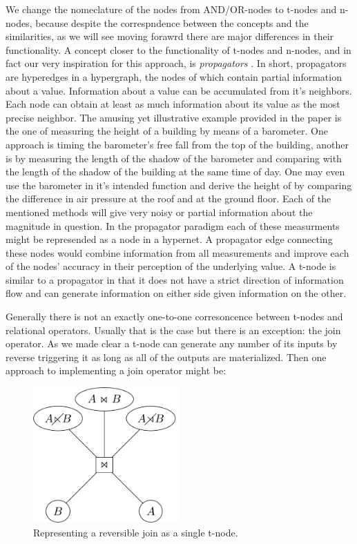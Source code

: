 We change the nomeclature of the nodes from AND/OR-nodes to t-nodes
and n-nodes, because despite the correspndence between the concepts
and the similarities, as we will see moving forawrd there are major
differences in their functionality. A concept closer to the
functionality of t-nodes and n-nodes, and in fact our very inspiration
for this approach, is \emph{propagators}
\cite{radulPropagationNetworksFlexible2009a}. In short, propagators are
hyperedges in a hypergraph, the nodes of which contain partial
information about a value. Information about a value can be
accumulated from it's neighbors. Each node can obtain at least as much
information about its value as the most precise neighbor. The amusing
yet illustrative example provided in the paper is the one of measuring
the height of a building by means of a barometer. One approach is
timing the barometer's free fall from the top of the building, another
is by measuring the length of the shadow of the barometer and
comparing with the length of the shadow of the building at the same
time of day. One may even use the barometer in it's intended function
and derive the height of by comparing the difference in air pressure
at the roof and at the ground floor. Each of the mentioned methods
will give very noisy or partial information about the magnitude in
question. In the propagator paradigm each of these measurments might
be represended as a node in a hypernet. A propagator edge connecting
these nodes would combine information from all measurements and
improve each of the nodes' accuracy in their perception of the
underlying value. A t-node is similar to a propagator in that it does
not have a strict direction of information flow and can generate
information on either side given information on the other.

Generally there is not an exactly one-to-one corresoncence between
t-nodes and relational operators. Usually that is the case but
there is an exception: the join operator. As we made clear a t-node
can generate any number of its inputs by reverse triggering it as
long as all of the outputs are materialized. Then one approach to
implementing a join operator might be:

\begin{figure}[H]
  \centering
  \includegraphics[width=0.5\textwidth]{./imgs/naivejoinnet.pdf}
  \caption{\label{fig:org78bb458}Representing a reversible join as a single t-node.}
\end{figure}


